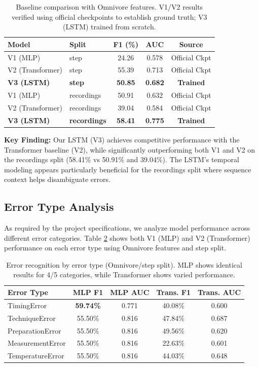 \documentclass[10pt,twocolumn,letterpaper]{article}
\begin{document}
\begin{table}[h]
\centering
\caption{Baseline comparison with Omnivore features. V1/V2 results verified using official checkpoints to establish ground truth; V3 (LSTM) trained from scratch.}
\label{tab:baseline_comparison}
\begin{tabular}{llccc}
\toprule
Model & Split & F1 (\%) & AUC & Source \\
\midrule
V1 (MLP) & step & 24.26 & 0.578 & Official Ckpt \\
V2 (Transformer) & step & 55.39 & 0.713 & Official Ckpt \\
\textbf{V3 (LSTM)} & \textbf{step} & \textbf{50.85} & \textbf{0.682} & \textbf{Trained} \\
\midrule
V1 (MLP) & recordings & 50.91 & 0.632 & Official Ckpt \\
V2 (Transformer) & recordings & 39.04 & 0.584 & Official Ckpt \\
\textbf{V3 (LSTM)} & \textbf{recordings} & \textbf{58.41} & \textbf{0.775} & \textbf{Trained} \\
\bottomrule
\end{tabular}
\end{table}

\textbf{Key Finding:} Our LSTM (V3) achieves competitive performance with the Transformer baseline (V2), while significantly outperforming both V1 and V2 on the recordings split (58.41\% vs 50.91\% and 39.04\%). The LSTM's temporal modeling appears particularly beneficial for the recordings split where sequence context helps disambiguate errors.

\subsection{Error Type Analysis}

As required by the project specifications, we analyze model performance across different error categories. Table \ref{tab:error_types} shows both V1 (MLP) and V2 (Transformer) performance on each error type using Omnivore features and step split.

\begin{table}[h]
\centering
\caption{Error recognition by error type (Omnivore/step split). MLP shows identical results for 4/5 categories, while Transformer shows varied performance.}
\label{tab:error_types}
\begin{tabular}{lcccc}
\toprule
Error Type & MLP F1 & MLP AUC & Trans. F1 & Trans. AUC \\
\midrule
TimingError & \textbf{59.74\%} & 0.771 & 40.08\% & 0.600 \\
TechniqueError & 55.50\% & 0.816 & 47.84\% & 0.687 \\
PreparationError & 55.50\% & 0.816 & 49.56\% & 0.620 \\
MeasurementError & 55.50\% & 0.816 & 22.63\% & 0.601 \\
TemperatureError & 55.50\% & 0.816 & 44.03\% & 0.648 \\
\bottomrule
\end{tabular}
\end{table}
\end{document}
